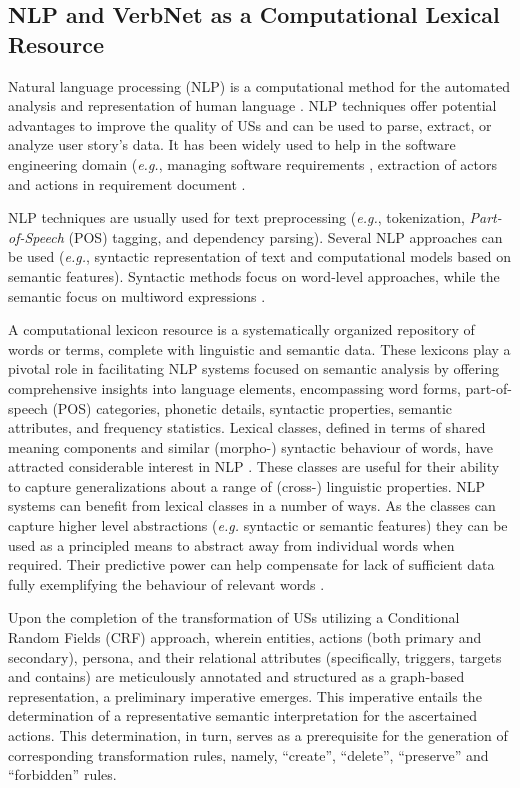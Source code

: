 \subsection{NLP and VerbNet as a Computational Lexical Resource}\label{nlp}
Natural language processing (NLP) is a computational method for the automated analysis and representation of human language \cite{cambria2014jumping}. NLP techniques offer potential advantages to improve the quality of USs and can be used to parse, extract, or analyze user story's data. It has been widely used to help in the software engineering domain (\emph{e.g.}, managing software requirements \cite{Arias2018}, extraction of actors and actions in requirement document \cite{al2018use}.

NLP techniques are usually used for text preprocessing (\emph{e.g.}, tokenization, \emph{Part-of-Speech} (POS) tagging, and dependency parsing). Several NLP approaches can be used (\emph{e.g.}, syntactic representation of text and computational models based on semantic features). Syntactic methods focus on word-level approaches, while the semantic focus on multiword expressions \cite{cambria2014jumping}.

A computational lexicon resource is a systematically organized repository of words or terms, complete with linguistic and semantic data. These lexicons play a pivotal role in facilitating NLP systems focused on semantic analysis by offering comprehensive insights into language elements, encompassing word forms, part-of-speech (POS) categories, phonetic details, syntactic properties, semantic attributes, and frequency statistics. Lexical classes, defined in terms of shared meaning components and similar (morpho-) syntactic behaviour of words, have attracted considerable interest in NLP \cite{cambria2014jumping}. These classes are useful for their ability to capture generalizations about a range of (cross-) linguistic properties. NLP systems can benefit from lexical classes in a number of ways. As the classes can capture higher level abstractions (\emph{e.g.} syntactic or semantic features) they can be used as a principled means to abstract away from individual words when required. Their predictive power can help compensate for lack of sufficient data fully exemplifying the behaviour of relevant words \cite{kipper2006extending}.

Upon the completion of the transformation of USs utilizing a Conditional Random Fields (CRF) approach, wherein entities, actions (both primary and secondary), persona, and their relational attributes (specifically, triggers, targets and contains) are meticulously annotated and structured as a graph-based representation, a preliminary imperative emerges. This imperative entails the determination of a representative semantic interpretation for the ascertained actions. This determination, in turn, serves as a prerequisite for the generation of corresponding transformation rules, namely, \enquote{create}, \enquote{delete}, \enquote{preserve} and \enquote{forbidden} rules.

